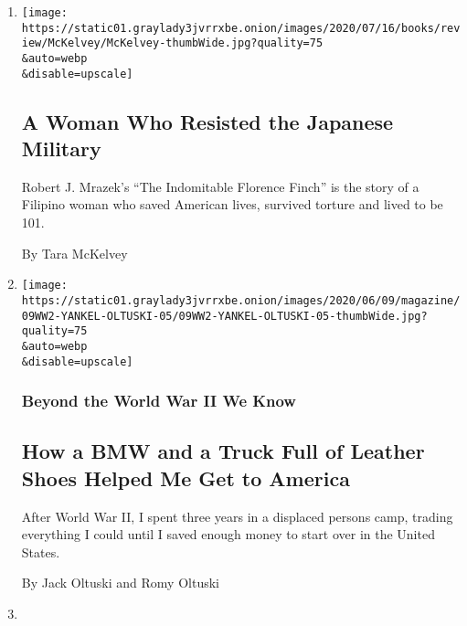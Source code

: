 \begin{enumerate}
\def\labelenumi{\arabic{enumi}.}
\item
  \href{/2020/07/22/books/review/the-indomitable-florence-finch-robert-j-mrazek.html}{}

  \texttt{[image: https://static01.graylady3jvrrxbe.onion/images/2020/07/16/books/review/McKelvey/McKelvey-thumbWide.jpg?quality=75\\\&auto=webp\\\&disable=upscale]}

  \hypertarget{a-woman-who-resisted-the-japanese-military}{%
  \subsection{A Woman Who Resisted the Japanese
  Military}\label{a-woman-who-resisted-the-japanese-military}}

  Robert J. Mrazek's ``The Indomitable Florence Finch'' is the story of
  a Filipino woman who saved American lives, survived torture and lived
  to be 101.

  By Tara McKelvey
\item
  \href{/2020/06/09/magazine/how-a-bmw-and-a-truck-full-of-leather-shoes-helped-me-get-to-america.html}{}

  \texttt{[image: https://static01.graylady3jvrrxbe.onion/images/2020/06/09/magazine/09WW2-YANKEL-OLTUSKI-05/09WW2-YANKEL-OLTUSKI-05-thumbWide.jpg?quality=75\\\&auto=webp\\\&disable=upscale]}

  \hypertarget{beyond-the-world-war-ii-we-know-7}{%
  \subsubsection{Beyond the World War II We
  Know}\label{beyond-the-world-war-ii-we-know-7}}

  \hypertarget{how-a-bmw-and-a-truck-full-of-leather-shoes-helped-me-get-to-america}{%
  \subsection{How a BMW and a Truck Full of Leather Shoes Helped Me Get
  to
  America}\label{how-a-bmw-and-a-truck-full-of-leather-shoes-helped-me-get-to-america}}

  After World War II, I spent three years in a displaced persons camp,
  trading everything I could until I saved enough money to start over in
  the United States.

  By Jack Oltuski and Romy Oltuski
\item
  \href{/2020/05/27/magazine/world-war-ii-mexican-air-force.html}{}


\end{enumerate}
